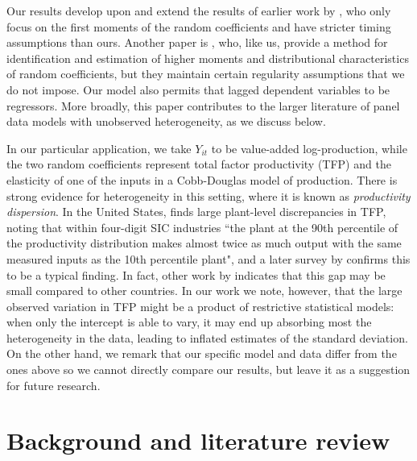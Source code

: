 Our results develop upon and extend the results of earlier work by \cite{graham2012identification}, who only focus on the first moments of the random coefficients and have stricter timing assumptions than ours. Another paper is \cite{arellano2011identifying}, who, like us, provide a method for identification and estimation of higher moments and distributional characteristics of random coefficients, but they maintain certain regularity assumptions that we do not impose.  Our model also permits that lagged dependent variables to be regressors. More broadly, this paper contributes to the larger literature of panel data models with unobserved heterogeneity, as we discuss below.


In our particular application, we take $Y_{it}$ to be value-added log-production, while the two random coefficients represent total factor productivity (TFP) and the elasticity of one of the inputs in a Cobb-Douglas model of production. There is strong evidence for heterogeneity in this setting, where it is known as \emph{productivity dispersion}. In the United States, \cite{syverson2004product} finds large plant-level discrepancies in TFP, noting that within four-digit SIC industries ``the plant at the 90th percentile of the productivity distribution makes almost twice as much output with the same measured inputs as the 10th percentile plant", and a later survey by \cite{syverson2011determines} confirms this to be a typical finding. In fact, other work by \citep{hsieh2009misallocation} indicates that this gap may be small compared to other countries. In our work we note, however, that the large observed variation in TFP might be a product of restrictive statistical models: when only the intercept is able to vary, it may end up absorbing most the heterogeneity in the data, leading to inflated estimates of the standard deviation. On the other hand, we remark that our specific model and data differ from the ones above so we cannot directly compare our results, but leave it as a suggestion for future research.



\section{Background and literature review}

